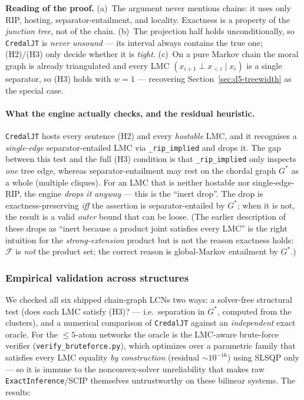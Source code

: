 \documentclass[11pt]{article}
\begin{document}
\noindent\textbf{Reading of the proof.} (a)~The argument never mentions chains: it uses only RIP,
hosting, separator-entailment, and locality. Exactness is a property of the \emph{junction tree},
not of the chain. (b)~The projection half holds unconditionally, so \texttt{CredalJT} is \emph{never
unsound} --- its interval always contains the true one; (H2)/(H3) only decide whether it is
\emph{tight}. (c)~On a pure Markov chain the moral graph is already triangulated and every LMC
$(x_{i+1}\perp x_{<i}\mid x_i)$ is a single separator, so (H3) holds with $w{=}1$ --- recovering
Section~\ref{sec:d5-treewidth} as the special case.

\paragraph{What the engine actually checks, and the residual heuristic.} \texttt{CredalJT} hosts every
sentence (H2) and every \emph{hostable} LMC, and it recognises a \emph{single-edge} separator-entailed
LMC via \texttt{\_rip\_implied} and drops it. The gap between this test and the full (H3) condition is
that \texttt{\_rip\_implied} only inspects \emph{one} tree edge, whereas separator-entailment may rest
on the chordal graph $G^\ast$ as a whole (multiple cliques). For an LMC that is neither hostable nor
single-edge-RIP, the engine \emph{drops it anyway} --- this is the ``inert drop''. The drop is
exactness-preserving \emph{iff} the assertion is separator-entailed by $G^\ast$; when it is not, the
result is a valid \emph{outer} bound that can be loose. (The earlier description of these drops as
``inert because a product joint satisfies every LMC'' is the right intuition for the
\emph{strong-extension} product but is not the reason exactness holds: $\mathcal F$ is \emph{not} the
product set; the correct reason is global-Markov entailment by $G^\ast$.)

\subsubsection{Empirical validation across structures}

We checked all six shipped chain-graph LCNs two ways: a solver-free structural test (does each LMC
satisfy (H3)? --- i.e.\ separation in $G^\ast$, computed from the clusters), and a numerical
comparison of \texttt{CredalJT} against an \emph{independent} exact oracle. For the $\le 5$-atom
networks the oracle is the LMC-aware brute-force verifier
(\texttt{verify\_bruteforce.py}), which optimizes over a parametric family that satisfies every LMC
equality \emph{by construction} (residual $\sim10^{-16}$) using SLSQP only --- so it is immune to the
nonconvex-solver unreliability that makes raw \texttt{ExactInference}/SCIP themselves untrustworthy on
these bilinear systems. The results:
\end{document}

